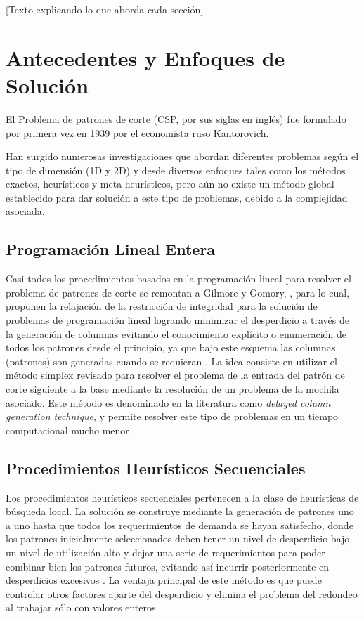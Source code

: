 \documentclass[a4paper,10pt,twocolumn]{article}
\begin{document}
[Texto explicando lo que aborda cada sección]


\section{Antecedentes y Enfoques de Solución}
El Problema de patrones de corte (CSP, por sus siglas
en inglés) fue formulado por primera vez en 1939
por el economista ruso Kantorovich.

Han surgido numerosas investigaciones que abordan
diferentes problemas según el tipo de dimensión (1D y
2D) y desde diversos enfoques tales como los métodos
exactos, heurísticos y meta heurísticos, pero aún no
existe un método global establecido para dar solución
a este tipo de problemas, debido a la complejidad
asociada. 

\subsection{Programación Lineal Entera}

Casi todos los procedimientos basados en la
programación lineal para resolver el problema de
patrones de corte se remontan a Gilmore y Gomory,
\cite{1}, para lo cual, proponen la relajación de la restricción
de integridad para la solución de problemas de
programación lineal logrando minimizar el desperdicio
a través de la generación de columnas evitando el
conocimiento explícito o enumeración de todos los
patrones desde el principio, ya que bajo este esquema
las columnas (patrones) son generadas cuando se
requieran \cite{2}. La idea consiste en utilizar el método
simplex revisado para resolver el problema de la entrada
del patrón de corte siguiente a la base mediante la
resolución de un problema de la mochila asociado. Este
método es denominado en la literatura como \textit{delayed
column generation technique}, y permite resolver este
tipo de problemas en un tiempo computacional mucho
menor \cite{3}.


\subsection{Procedimientos Heurísticos Secuenciales}
Los procedimientos heurísticos secuenciales pertenecen
a la clase de heurísticas de búsqueda local. La solución
se construye mediante la generación de patrones uno
a uno hasta que todos los requerimientos de demanda
se hayan satisfecho, donde los patrones inicialmente
seleccionados deben tener un nivel de desperdicio
bajo, un nivel de utilización alto y dejar una serie de requerimientos para poder combinar bien los patrones
futuros, evitando así incurrir posteriormente en
desperdicios excesivos \cite{3}. La ventaja principal de este método es que puede controlar otros factores aparte del desperdicio y elimina
el problema del redondeo al trabajar sólo con valores
enteros.
\end{document}

